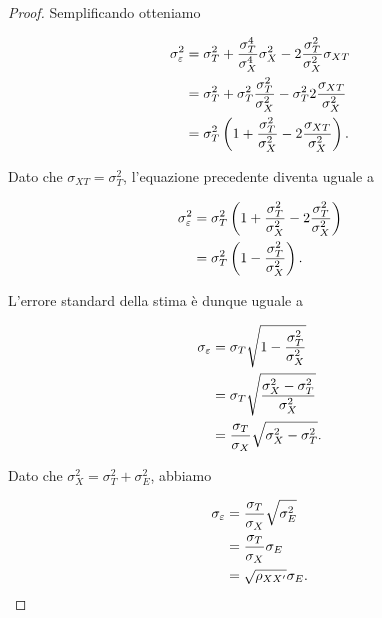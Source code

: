\documentclass[
  11pt,
]{krantz}
\theoremstyle{definition}
\theoremstyle{definition}
\theoremstyle{definition}
\theoremstyle{definition}
\theoremstyle{remark}
\begin{document}
\begin{proof}
Semplificando otteniamo

\begin{equation}
\begin{aligned}
\sigma^2_{\varepsilon} &= \sigma^2_T + \frac{\sigma_T^4}{\sigma_X^4}
\sigma^2_X - 2  \frac{\sigma_T^2}{\sigma_X^2} \sigma_{XT}\notag\\ 
&= \sigma^2_T + \sigma^2_T\frac{\sigma_T^2}{\sigma_X^2} -  \sigma_T^2 2
\frac{\sigma_{XT}}{\sigma_X^2} \notag\\ 
&= \sigma^2_T \left(1 + \frac{\sigma_T^2}{\sigma_X^2} - 2
  \frac{\sigma_{XT}}{\sigma_X^2}\right).\notag 
  \end{aligned}
\end{equation}

Dato che \(\sigma_{XT}=\sigma^2_T\), l'equazione precedente diventa uguale a

\begin{equation}
\begin{aligned}
\sigma^2_{\varepsilon} &= \sigma^2_T \left(1
  +\frac{\sigma_T^2}{\sigma_X^2} - 2
  \frac{\sigma_{T}^2}{\sigma_X^2}\right)\notag\\
&= \sigma^2_T \left(1 - 
  \frac{\sigma_{T}^2}{\sigma_X^2}\right).
\end{aligned}
\end{equation}

L'errore standard della stima è dunque uguale a

\begin{equation}
\begin{aligned}
\sigma_{\varepsilon} 
&=\sigma_T \sqrt{1-\frac{\sigma^2_T}{\sigma^2_X}}\notag\\
&=\sigma_T \sqrt{\frac{\sigma^2_X - \sigma^2_T}{\sigma^2_X}}\notag\\
&=\frac{\sigma_T}{\sigma_X} \sqrt{\sigma^2_X - \sigma^2_T}.
\end{aligned}
\end{equation}

Dato che \(\sigma^2_X=\sigma^2_T+\sigma^2_E\), abbiamo

\begin{equation}
\begin{aligned}
\sigma_{\varepsilon} 
 &= \frac{\sigma_T}{\sigma_X} \sqrt{\sigma^2_E }\notag\\
&=  \frac{\sigma_T}{\sigma_X} \sigma_E \notag\\
&= \sqrt{\rho_{XX^\prime}} \sigma_E. \notag
\end{aligned}
\end{equation}


\end{proof}
\end{document}
